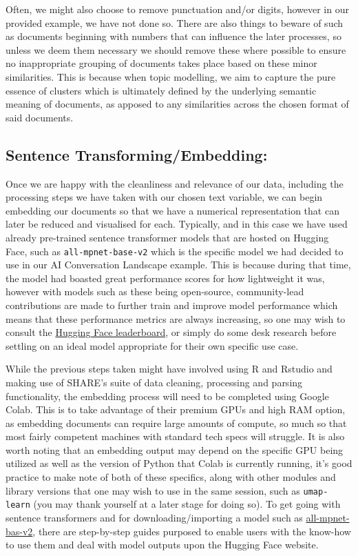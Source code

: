 \documentclass[
  letterpaper,
  DIV=11,
  numbers=noendperiod]{scrreprt}
\begin{document}
Often, we might also choose to remove punctuation and/or digits, however
in our provided example, we have not done so. There are also things to
beware of such as documents beginning with numbers that can influence
the later processes, so unless we deem them necessary we should remove
these where possible to ensure no inappropriate grouping of documents
takes place based on these minor similarities. This is because when
topic modelling, we aim to capture the pure essence of clusters which is
ultimately defined by the underlying semantic meaning of documents, as
apposed to any similarities across the chosen format of said documents.

\subsection{Sentence
Transforming/Embedding:}\label{sentence-transformingembedding}

Once we are happy with the cleanliness and relevance of our data,
including the processing steps we have taken with our chosen text
variable, we can begin embedding our documents so that we have a
numerical representation that can later be reduced and visualised for
each. Typically, and in this case we have used already pre-trained
sentence transformer models that are hosted on Hugging Face, such as
\texttt{all-mpnet-base-v2} which is the specific model we had decided to
use in our AI Conversation Landscape example. This is because during
that time, the model had boasted great performance scores for how
lightweight it was, however with models such as these being open-source,
community-lead contributions are made to further train and improve model
performance which means that these performance metrics are always
increasing, so one may wish to consult the
\href{https://huggingface.co/spaces/mteb/leaderboard}{Hugging Face
leaderboard}, or simply do some desk research before settling on an
ideal model appropriate for their own specific use case.

While the previous steps taken might have involved using R and Rstudio
and making use of SHARE's suite of data cleaning, processing and parsing
functionality, the embedding process will need to be completed using
Google Colab. This is to take advantage of their premium GPUs and high
RAM option, as embedding documents can require large amounts of compute,
so much so that most fairly competent machines with standard tech specs
will struggle. It is also worth noting that an embedding output may
depend on the specific GPU being utilized as well as the version of
Python that Colab is currently running, it's good practice to make note
of both of these specifics, along with other modules and library
versions that one may wish to use in the same session, such as
\texttt{umap-learn} (you may thank yourself at a later stage for doing
so). To get going with sentence transformers and for
downloading/importing a model such as
\href{https://huggingface.co/sentence-transformers/all-mpnet-base-v2}{all-mpnet-bas-v2},
there are step-by-step guides purposed to enable users with the know-how
to use them and deal with model outputs upon the Hugging Face website.
\end{document}
